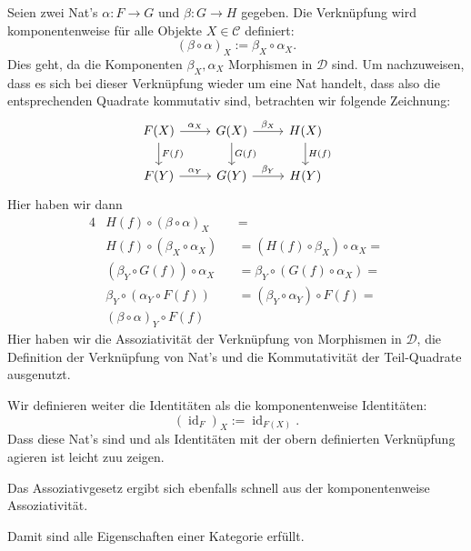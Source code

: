 \documentclass[a4paper]{amsart}
\theoremstyle{definition}
\DeclareMathOperator{\id}{id}
\newcommand{\CC}{\ensuremath{\mathcal{ C }}}
\newcommand{\DD}{\ensuremath{\mathcal{ D }}}
\begin{document}
Seien zwei Nat's $\alpha \colon F \to G$ und $\beta \colon G \to H$ gegeben. Die Verknüpfung wird komponentenweise für alle Objekte $X \in \CC$ definiert:
\begin{equation}
   (\beta \circ \alpha)_X := \beta_X \circ \alpha_X.
\end{equation}
Dies geht, da die Komponenten $\beta_X, \alpha_X$ Morphismen in $\DD$ sind. Um nachzuweisen, dass es sich bei dieser Verknüpfung wieder um eine Nat handelt, dass also die entsprechenden Quadrate kommutativ sind, betrachten wir folgende Zeichnung:
\begin{equation}\label{kommutativ}
   \begin{tikzcd}
       F(X) \arrow[r, "\alpha_X"] \arrow[d, "F(f)"]
      &G(X) \arrow[r, "\beta_X" ] \arrow[d, "G(f)"]
      &H(X)                       \arrow[d, "H(f)"]
      \\
       F(Y) \arrow[r, "\alpha_Y"]  
      &G(Y) \arrow[r, "\beta_Y" ]  
      & H(Y)
   \end{tikzcd}
\end{equation}
Hier haben wir dann
\begin{alignat}{4}
   &H(f) \circ (\beta \circ \alpha)_X   &&= \\
   &H(f) \circ (\beta_X \circ \alpha_X) &&= (H(f) \circ \beta_X) \circ \alpha_X = \\
   &(\beta_Y \circ G(f)) \circ \alpha_X &&= \beta_Y \circ (G(f) \circ \alpha_X) = \\
   &\beta_Y \circ (\alpha_Y \circ F(f)) &&= (\beta_Y \circ \alpha_Y) \circ F(f) = \\
   &(\beta \circ \alpha)_Y \circ F(f)
\end{alignat}
Hier haben wir die Assoziativität der Verknüpfung von Morphismen in $\DD$, die Definition der Verknüpfung von Nat's und die Kommutativität der Teil-Quadrate ausgenutzt.

Wir definieren weiter die Identitäten als die komponentenweise Identitäten:
\begin{equation}
   (\id_F)_X := \id_{F(X)}.
\end{equation}
Dass diese Nat's sind und als Identitäten mit der obern definierten Verknüpfung agieren ist leicht zuu zeigen.

Das Assoziativgesetz ergibt sich ebenfalls schnell aus der komponentenweise Assoziativität. 

Damit sind alle Eigenschaften einer Kategorie erfüllt.

\end{document}
